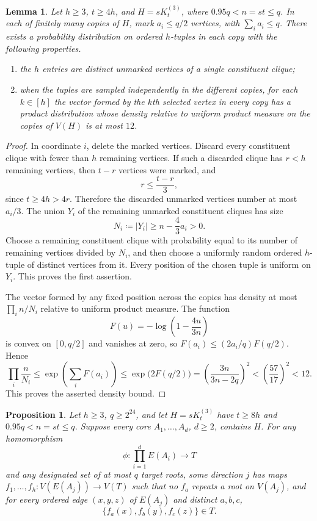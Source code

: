 \documentclass[10pt]{article}
\numberwithin{equation}{section}
\newtheorem{lemma}[lemma]{Lemma}\aliascntresetthe{lemma}
\newtheorem{proposition}[proposition]{Proposition}\aliascntresetthe{proposition}
\theoremstyle{definition}
\begin{document}
\begin{lemma}
\label{lem:guard-clique-normalized-sampling}
Let $h\ge3$, $t\ge4h$, and $H=sK_t^{(3)}$, where $0.95q<n=st\le q$. In each of finitely many copies of $H$, mark $a_i\le q/2$ vertices, with $\sum_i a_i\le q$. There exists a probability distribution on ordered $h$-tuples in each copy with the following properties.
\begin{enumerate}
\item the $h$ entries are distinct unmarked vertices of a single
constituent clique;
\item when the tuples are sampled independently in the different copies, for each $k\in[h]$ the vector formed by the $k$th selected vertex in every copy has a product distribution whose density relative to uniform product measure on the copies of $V(H)$ is at most $12$.
\end{enumerate}
\end{lemma}
\begin{proof}
In coordinate $i$, delete the marked vertices. Discard every constituent clique with fewer than $h$ remaining vertices. If such a discarded clique has $r<h$ remaining vertices, then $t-r$ vertices were marked, and
\[
 r\le\frac{t-r}{3},
\]
since $t\ge4h>4r$. Therefore the discarded unmarked vertices number at most $a_i/3$. The union $Y_i$ of the remaining unmarked constituent cliques has size
\[
 N_i\coloneqq|Y_i|\ge n-\frac43a_i>0.
\]
Choose a remaining constituent clique with probability equal to its number of remaining vertices divided by $N_i$, and then choose a uniformly random ordered $h$-tuple of distinct vertices from it. Every position of the chosen tuple is uniform on $Y_i$. This proves the first assertion.

The vector formed by any fixed position across the copies has density at most $\prod_i n/N_i$ relative to uniform product measure. The function
\[
 F(u)=-\log\left(1-\frac{4u}{3n}\right)
\]
is convex on $[0,q/2]$ and vanishes at zero, so $F(a_i)\le(2a_i/q)F(q/2)$. Hence
\[
 \prod_i\frac n{N_i}
 \le\exp\left(\sum_iF(a_i)\right)
 \le\exp\bigl(2F(q/2)\bigr)
 =\left(\frac{3n}{3n-2q}\right)^2
 <\left(\frac{57}{17}\right)^2<12.
\]
This proves the asserted density bound.
\end{proof}
\begin{proposition}
\label{prop:elementary-profiles}
Let $h\ge3$, $q\ge2^{24}$, and let $H=sK_t^{(3)}$ have $t\ge8h$ and $0.95q<n=st\le q$. Suppose every core $A_1,\ldots,A_d$, $d\ge2$, contains $H$. For any homomorphism
\[
 \phi\colon\prod_{i=1}^dE(A_i)\longrightarrow T
\]
and any designated set of at most $q$ target roots, some direction $j$ has maps $f_1,\ldots,f_h\colon V(E(A_j))\to V(T)$ such that no $f_a$ repeats a root on $V(A_j)$, and for every ordered edge $(x,y,z)$ of $E(A_j)$ and distinct $a,b,c$,
\[
 \{f_a(x),f_b(y),f_c(z)\}\in T.
\]
\end{proposition}
\end{document}

